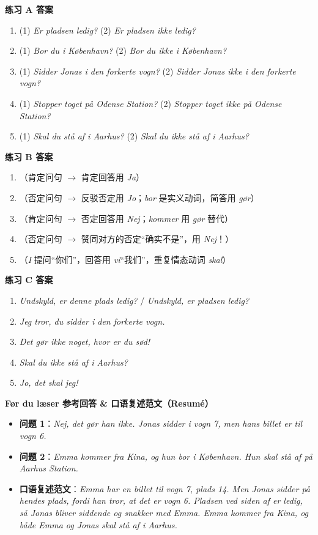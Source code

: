 \begin{answerbox}
\textbf{练习 A 答案}
\begin{enumerate}
  \item (1) \textit{Er pladsen ledig?} \quad (2) \textit{Er pladsen ikke ledig?}
  \item (1) \textit{Bor du i København?} \quad (2) \textit{Bor du ikke i København?}
  \item (1) \textit{Sidder Jonas i den forkerte vogn?} \quad (2) \textit{Sidder Jonas ikke i den forkerte vogn?}
  \item (1) \textit{Stopper toget på Odense Station?} \quad (2) \textit{Stopper toget ikke på Odense Station?}
  \item (1) \textit{Skal du stå af i Aarhus?} \quad (2) \textit{Skal du ikke stå af i Aarhus?}
\end{enumerate}

\textbf{练习 B 答案}
\begin{enumerate}
  \item {}（肯定问句 $\rightarrow$ 肯定回答用 \textit{Ja}）
  \item {}（否定问句 $\rightarrow$ 反驳否定用 \textit{Jo}；\textit{bor} 是实义动词，简答用 \textit{gør}）
  \item {}（肯定问句 $\rightarrow$ 否定回答用 \textit{Nej}；\textit{kommer} 用 \textit{gør} 替代）
  \item {}（否定问句 $\rightarrow$ 赞同对方的否定“确实不是”，用 \textit{Nej}！）
  \item {}（\textit{I} 提问“你们”，回答用 \textit{vi}“我们”，重复情态动词 \textit{skal}）
\end{enumerate}

\textbf{练习 C 答案}
\begin{enumerate}
  \item \textit{Undskyld, er denne plads ledig?} / \textit{Undskyld, er pladsen ledig?}
  \item \textit{Jeg tror, du sidder i den forkerte vogn.}
  \item \textit{Det gør ikke noget, hvor er du sød!}
  \item \textit{Skal du ikke stå af i Aarhus?}
  \item \textit{Jo, det skal jeg!}
\end{enumerate}

\textbf{Før du læser 参考回答 \& 口语复述范文（Resumé）}
\begin{itemize}
  \item \textbf{问题 1}：\textit{Nej, det gør han ikke. Jonas sidder i vogn 7, men hans billet er til vogn 6.}
  \item \textbf{问题 2}：\textit{Emma kommer fra Kina, og hun bor i København. Hun skal stå af på Aarhus Station.}
  \item \textbf{口语复述范文}：\textit{Emma har en billet til vogn 7, plads 14. Men Jonas sidder på hendes plads, fordi han tror, at det er vogn 6. Pladsen ved siden af er ledig, så Jonas bliver siddende og snakker med Emma. Emma kommer fra Kina, og både Emma og Jonas skal stå af i Aarhus.}
\end{itemize}
\end{answerbox}
